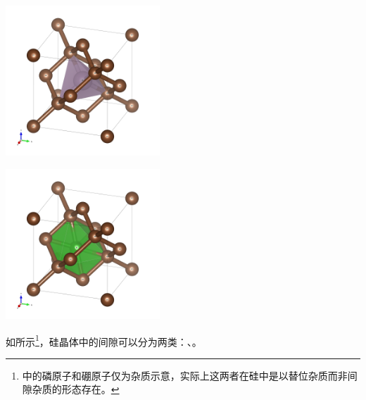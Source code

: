 \begin{Figure}[硅的两类间隙]
    \begin{FigureSub}[四面体间隙]
        \includegraphics[width=5.8cm]{VESTA/output/Diamond1.png}
    \end{FigureSub}
    \hspace{0.5cm}
    \begin{FigureSub}[六角形间隙]
        \includegraphics[width=5.8cm]{VESTA/output/Diamond2.png}
    \end{FigureSub}
\end{Figure}

如所示\footnote{中的磷原子和硼原子仅为杂质示意，实际上这两者在硅中是以替位杂质而非间隙杂质的形态存在。}，硅晶体中的间隙可以分为两类：、。\goodbreak

